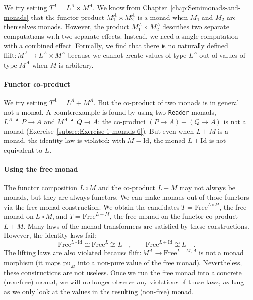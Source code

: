 We try setting $T^{A}=L^{A}\times M^{A}$. We know from Chapter~\ref{chap:Semimonads-and-monads}
that the functor product $M_{1}^{A}\times M_{2}^{A}$ is a monad when
$M_{1}$ and $M_{2}$ are themselves monads. However, the product
$M_{1}^{A}\times M_{2}^{A}$ describes two separate computations with
two separate effects. Instead, we need a single computation with a
combined effect. Formally, we find that there is no naturally defined
$\text{flift}:M^{A}\rightarrow L^{A}\times M^{A}$ because we cannot
create values of type $L^{A}$ out of values of type $M^{A}$ when
$M$ is arbitrary.

\paragraph{Functor co-product}

We try setting $T^{A}=L^{A}+M^{A}$. But the co-product of two monads
is in general not a monad. A counterexample is found by using two
\lstinline!Reader! monads, $L^{A}\triangleq P\rightarrow A$ and
$M^{A}\triangleq Q\rightarrow A$: the co-product $\left(P\rightarrow A\right)+\left(Q\rightarrow A\right)$
is not a monad (Exercise~\ref{subsec:Exercise-1-monads-6}). But
even when $L+M$ is a monad, the identity law is violated: with $M=\text{Id}$,
the monad $L+\text{Id}$ is not equivalent to $L$.

\paragraph{Using the free monad}

The functor composition $L\circ M$ and the co-product $L+M$ may
not always be monads, but they are always functors. We can make monads
out of those functors via the free monad construction. We obtain the
candidates $T=\text{Free}^{L\circ M}$, the free monad on $L\circ M$,
and $T=\text{Free}^{L+M}$, the free monad on the functor co-product
$L+M$. Many laws of the monad transformers are satisfied by these
constructions. However, the identity laws fail:
\[
\text{Free}^{L\circ\text{Id}}\cong\text{Free}^{L}\not\cong L\quad,\quad\quad\text{Free}^{L+\text{Id}}\not\cong L\quad.
\]
The lifting laws are also violated because $\text{flift}:M^{A}\rightarrow\text{Free}^{L+M,A}$
is not a monad morphism (it maps $\text{pu}_{M}$ into a non-pure
value of the free monad). Nevertheless, these constructions are not
useless. Once we run the free monad into a concrete (non-free) monad,
we will no longer observe any violations of those laws, as long as
we only look at the values in the resulting (non-free) monad.

